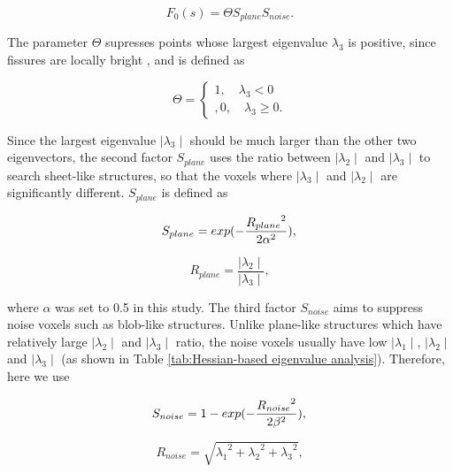 {\begin{equation}
\label{eq:FissureHessian1}
F_0(s) = \Theta S_{plane} S_{noise}.
\end{equation}

The parameter $\Theta$ supresses points whose largest eigenvalue $\lambda_{3}$ is positive, since fissures are locally bright , and is defined as

\begin{equation}
\label{eq:FissureHessian2}
\Theta = \begin{cases}
         1,\quad \lambda_{3}< 0\\,
         0, \quad \lambda_{3}\geq0.
         \end{cases}
\end{equation}

Since the largest eigenvalue $\mid\lambda_{3}\mid$ should be much larger than the other two eigenvectors, the second factor $S_{plane}$ uses the ratio between $\mid\lambda_{2}\mid$ and $\mid\lambda_{3}\mid$ to search sheet-like structures, so that the voxels where $\mid\lambda_{3}\mid$ and $\mid\lambda_{2}\mid$ are significantly different. $S_{plane}$ is defined as

\begin{equation}
\label{eq:FissureHessian3}
S_{plane} = exp(-\frac{{R_{plane}}^2}{2\alpha^2}), \\
\end{equation}

\begin{equation}
\label{eq:FissureHessian4}
R_{plane} = \frac{\mid\lambda_{2}\mid}{\mid\lambda_{3}\mid},
\end{equation}

\noindent where $\alpha$ was set to 0.5 in this study. The third factor $S_{noise}$ aims to suppress noise voxels such as blob-like structures. Unlike plane-like structures which have relatively large $\mid\lambda_{2}\mid$ and $\mid\lambda_{3}\mid$ ratio, the noise voxels usually have low $\mid\lambda_{1}\mid$, $\mid\lambda_{2}\mid$ and $\mid\lambda_{3}\mid$ (as shown in Table \ref{tab:Hessian-based eigenvalue analysis}). Therefore, here we use

\begin{equation}
\label{eq:FissureHessian5}
S_{noise} = 1 - exp(-\frac{{R_{noise}}^2}{2\beta^2}), \\
\end{equation}

\begin{equation}
\label{eq:FissureHessian6}
R_{noise} = \sqrt{{\lambda_1}^2+{\lambda_2}^2+{\lambda_3}^2},
\end{equation}

}
